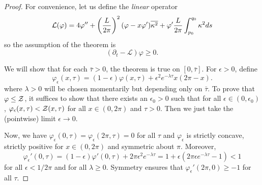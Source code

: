 \documentclass[a4paper, 12pt]{amsart}
\begin{document}
\begin{proof}
For convenience, let us define the \emph{linear} operator
\[
\mathcal{L} (\varphi) = 4 \varphi'' + \left(\frac{L}{2\pi}\right)^2 (\varphi - x \varphi') \overline{{\kappa^2}} + \varphi' \frac{L}{2\pi} \int_{p_0}^{q_0} \kappa^2 ds
\]
so the assumption of the theorem is
\[
(\partial_t - \mathcal{L}) \varphi \geq 0.
\]

We will show that for each \(\bar{\tau} > 0\), the theorem is true on \([0, \bar{\tau}]\). For \(\epsilon > 0\), define
\[
\varphi_{\epsilon} (x, \tau) = (1-\epsilon) \varphi(x, \tau) + \epsilon^2 e^{-\lambda\tau} x(2\pi - x).
\]
where \(\lambda > 0\) will be chosen momentarily but depending only on \(\bar{\tau}\). To prove that \(\varphi \leq \operatorname{\mathcal{Z}}\), it suffices to show that there exists an \(\epsilon_0 > 0\) such that for all \(\epsilon \in (0, \epsilon_0)\), \(\varphi_{\epsilon}(x, \tau) < \operatorname{\mathcal{Z}}(x, \tau)\) for all \(x \in (0, 2\pi)\) and \(\tau > 0\). Then we just take the (pointwise) limit \(\epsilon \to 0\).

Now, we have \(\varphi_{\epsilon}(0, \tau) = \varphi_{\epsilon}(2\pi, \tau) = 0\) for all \(\tau\) and \(\varphi_{\epsilon}\) is strictly concave, strictly positive for \(x \in (0, 2\pi)\) and symmetric about \(\pi\). Moreover,
\[
\varphi_{\epsilon}'(0, \tau) = (1-\epsilon) \varphi'(0, \tau) + 2\pi \epsilon^2 e^{-\lambda\tau} = 1 + \epsilon(2\pi \epsilon e^{-\lambda\tau} - 1) < 1
\]
for all \(\epsilon < 1/2\pi\) and for all \(\lambda \geq 0\). Symmetry ensures that \(\varphi_{\epsilon}'(2\pi, 0) \geq -1\) for all \(\tau\).


\end{proof}
\end{document}
